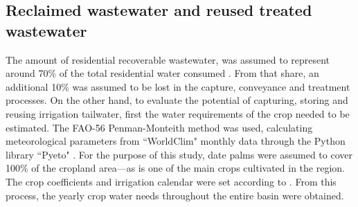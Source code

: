  



\subsection{Reclaimed wastewater and reused treated wastewater}
The amount of residential recoverable wastewater, was assumed to represent around 70\% of the total residential water consumed \cite{unescoWastewaterUntappedResource2017}. From that share, an additional 10\% was assumed to be lost in the capture, conveyance and treatment processes.
On the other hand, to evaluate the potential of capturing, storing and reusing irrigation tailwater, first the water requirements of the crop needed to be estimated. The FAO-56 Penman-Monteith method \cite{allenFAOIrrigationDrainage1998} was used, calculating meteorological parameters from ``WorldClim" monthly data \cite{WorldClimGlobalClimate} through the Python library ``Pyeto" \cite{pyeto}. For the purpose of this study, date palms were assumed to cover 100\% of the cropland area---as is one of the main crops cultivated in the region. The crop coefficients and irrigation calendar were set according to \citet{almullaNWSAS}. From this process, the yearly crop water needs throughout the entire basin were obtained.

